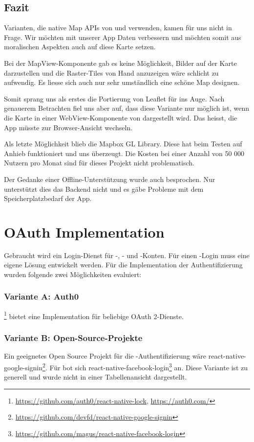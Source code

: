 \subsection{Fazit}
Varianten, die native Map APIs von  und  verwenden, kamen für uns nicht in Frage.
Wir möchten mit unserer App  Daten verbessern und möchten somit aus moralischen Aspekten auch auf diese Karte setzen. 

Bei der  MapView-Komponente gab es keine Möglichkeit, Bilder auf der Karte darzustellen und die Raster-Tiles von Hand anzuzeigen wäre schlicht zu aufwendig. 
Es liesse sich auch nur sehr umständlich eine schöne Map designen.

Somit sprang uns als erstes die Portierung von Leaflet für  ins Auge. 
Nach genauerem Betrachten fiel uns aber auf, dass diese Variante nur möglich ist, wenn die Karte in einer WebView-Komponente von  dargestellt wird. 
Das heisst, die App müsste zur Browser-Ansicht wechseln.

Als letzte Möglichkeit blieb die Mapbox GL Library.
Diese hat beim Testen auf Anhieb funktioniert und uns überzeugt.
Die Kosten bei einer Anzahl von 50 000 Nutzern pro Monat sind für dieses Projekt nicht problematisch.\cite{mapbox-pricing}

Der Gedanke einer Offline-Unterstützung wurde auch besprochen.
Nur unterstützt dies das Backend nicht und es gäbe Probleme mit dem Speicherplatzbedarf der App. 


\section{OAuth Implementation}
Gebraucht wird ein Login-Dienst für -, - und -Konten. 
Für einen -Login muss eine eigene Lösung entwickelt werden. 
Für die Implementation der Authentifizierung wurden folgende zwei Möglichkeiten evaluiert:


\subsubsection{Variante A: Auth0}
\footnote{\url{https://github.com/auth0/react-native-lock}, \url{https://auth0.com/}} bietet eine Implementation für beliebige \gls{OAuth} 2-Dienste. 


\subsubsection{Variante B: Open-Source-Projekte}
Ein geeignetes Open Source Projekt für die -Authentifizierung wäre react-native-google-signin\footnote{\url{https://github.com/devfd/react-native-google-signin}}. 
Für  bot sich react-native-facebook-login\footnote{\url{https://github.com/magus/react-native-facebook-login}} an. 
Diese Variante ist zu generell und wurde nicht in einer Tabellenansicht dargestellt. 

